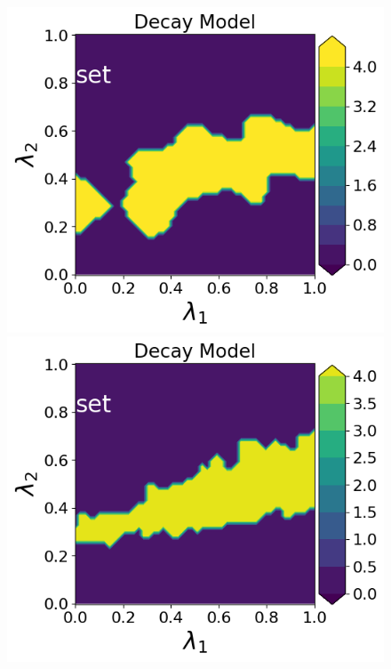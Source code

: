 \begin{figure}[h]
\begin{minipage}{.4\textwidth}
\includegraphics[width=\linewidth]{examples/fig_decay_q2/DecayModel--set_N50_em.png}
\includegraphics[width=\linewidth]{examples/fig_decay_q2/DecayModel--set_N500_em.png}
\end{minipage}
\begin{minipage}{.4\textwidth}

\end{minipage}
\end{figure}
